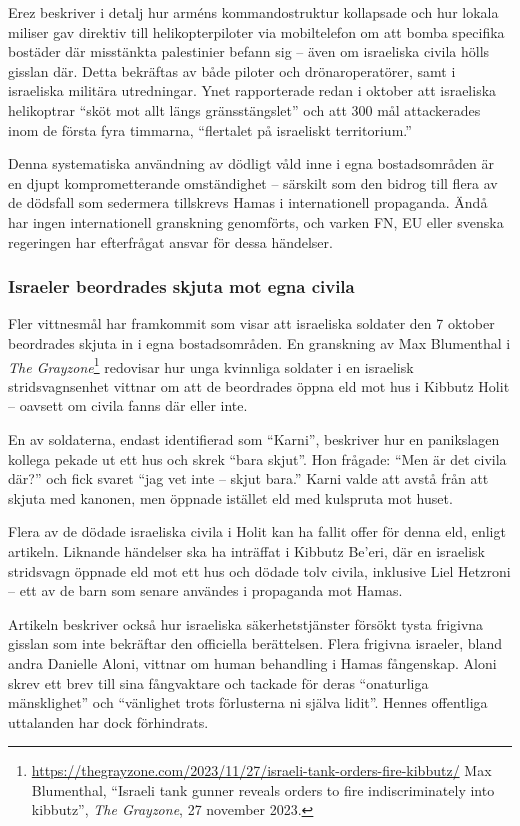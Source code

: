 Erez beskriver i detalj hur arméns kommandostruktur kollapsade och hur lokala miliser gav direktiv till helikopterpiloter via mobiltelefon om att bomba specifika bostäder där misstänkta palestinier befann sig – även om israeliska civila hölls gisslan där. Detta bekräftas av både piloter och drönaroperatörer, samt i israeliska militära utredningar. Ynet rapporterade redan i oktober att israeliska helikoptrar “sköt mot allt längs gränsstängslet” och att 300 mål attackerades inom de första fyra timmarna, “flertalet på israeliskt territorium.”

Denna systematiska användning av dödligt våld inne i egna bostadsområden är en djupt komprometterande omständighet – särskilt som den bidrog till flera av de dödsfall som sedermera tillskrevs Hamas i internationell propaganda. Ändå har ingen internationell granskning genomförts, och varken FN, EU eller svenska regeringen har efterfrågat ansvar för dessa händelser.

\subsubsection*{Israeler beordrades skjuta mot egna civila}


Fler vittnesmål har framkommit som visar att israeliska soldater den 7 oktober beordrades skjuta in i egna bostadsområden. En granskning av Max Blumenthal i \textit{The Grayzone}\footnote{\url{https://thegrayzone.com/2023/11/27/israeli-tank-orders-fire-kibbutz/} Max Blumenthal, “Israeli tank gunner reveals orders to fire indiscriminately into kibbutz”, \textit{The Grayzone}, 27 november 2023.} redovisar hur unga kvinnliga soldater i en israelisk stridsvagnsenhet vittnar om att de beordrades öppna eld mot hus i Kibbutz Holit – oavsett om civila fanns där eller inte. 

En av soldaterna, endast identifierad som “Karni”, beskriver hur en panikslagen kollega pekade ut ett hus och skrek “bara skjut”. Hon frågade: “Men är det civila där?” och fick svaret “jag vet inte – skjut bara.” Karni valde att avstå från att skjuta med kanonen, men öppnade istället eld med kulspruta mot huset.

Flera av de dödade israeliska civila i Holit kan ha fallit offer för denna eld, enligt artikeln. Liknande händelser ska ha inträffat i Kibbutz Be’eri, där en israelisk stridsvagn öppnade eld mot ett hus och dödade tolv civila, inklusive Liel Hetzroni – ett av de barn som senare användes i propaganda mot Hamas.

Artikeln beskriver också hur israeliska säkerhetstjänster försökt tysta frigivna gisslan som inte bekräftar den officiella berättelsen. Flera frigivna israeler, bland andra Danielle Aloni, vittnar om human behandling i Hamas fångenskap. Aloni skrev ett brev till sina fångvaktare och tackade för deras “onaturliga mänsklighet” och “vänlighet trots förlusterna ni själva lidit”. Hennes offentliga uttalanden har dock förhindrats.

